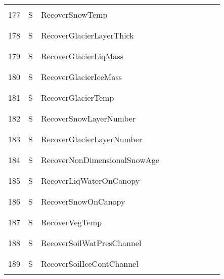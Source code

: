 \begin{longtable}{|c|c|l|c|c|c|c|p{}|c|p{}|}
&&&&&&&&&\\
177 & S & RecoverSnowTemp & & & & & & & \\
&&&&&&&&&\\\hline%
&&&&&&&&&\\
178 & S & RecoverGlacierLayerThick & & & & & & & \\
&&&&&&&&&\\\hline%
&&&&&&&&&\\
179 & S & RecoverGlacierLiqMass & & & & & & & \\
&&&&&&&&&\\\hline%
&&&&&&&&&\\
180 & S & RecoverGlacierIceMass & & & & & & & \\
&&&&&&&&&\\\hline%
&&&&&&&&&\\
181 & S & RecoverGlacierTemp & & & & & & & \\
&&&&&&&&&\\\hline%
&&&&&&&&&\\
182 & S & RecoverSnowLayerNumber & & & & & & & \\
&&&&&&&&&\\\hline%
&&&&&&&&&\\
183 & S & RecoverGlacierLayerNumber & & & & & & & \\
&&&&&&&&&\\\hline%
&&&&&&&&&\\
184 & S & RecoverNonDimensionalSnowAge & & & & & & & \\
&&&&&&&&&\\\hline%
&&&&&&&&&\\
185 & S & RecoverLiqWaterOnCanopy & & & & & & & \\
&&&&&&&&&\\\hline%
&&&&&&&&&\\
186 & S & RecoverSnowOnCanopy & & & & & & & \\
&&&&&&&&&\\\hline%
&&&&&&&&&\\
187 & S & RecoverVegTemp & & & & & & & \\
&&&&&&&&&\\\hline%
&&&&&&&&&\\
188 & S & RecoverSoilWatPresChannel & & & & & & & \\
&&&&&&&&&\\\hline%
&&&&&&&&&\\
189 & S & RecoverSoilIceContChannel & & & & & & & \\
&&&&&&&&&\\\hline%

\end{longtable}
